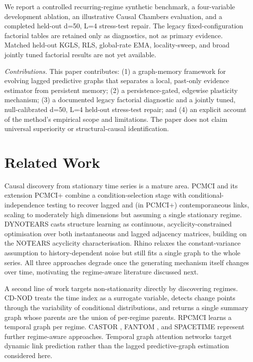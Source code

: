 \documentclass{ieeeaccess}
\begin{document}
We report a controlled recurring-regime synthetic benchmark, a four-variable development ablation, an illustrative Causal Chambers evaluation, and a completed held-out d=50, L=4 stress-test repair. The legacy fixed-configuration factorial tables are retained only as diagnostics, not as primary evidence. Matched held-out KGLS, RLS, global-rate EMA, locality-sweep, and broad jointly tuned factorial results are not yet available.

\noindent\textit{Contributions.} This paper contributes: (1) a graph-memory framework for evolving lagged predictive graphs that separates a local, past-only evidence estimator from persistent memory; (2) a persistence-gated, edgewise plasticity mechanism; (3) a documented legacy factorial diagnostic and a jointly tuned, null-calibrated d=50, L=4 held-out stress-test repair; and (4) an explicit account of the method's empirical scope and limitations. The paper does not claim universal superiority or structural-causal identification.

\section{Related Work}
\label{sec:related}
Causal discovery from stationary time series is a mature area. PCMCI and its extension PCMCI+ \cite{r1} combine a condition-selection stage with conditional-independence testing to recover lagged and (in PCMCI+) contemporaneous links, scaling to moderately high dimensions but assuming a single stationary regime. DYNOTEARS \cite{r2,r3} casts structure learning as continuous, acyclicity-constrained optimisation over both instantaneous and lagged adjacency matrices, building on the NOTEARS acyclicity characterisation. Rhino \cite{r4} relaxes the constant-variance assumption to history-dependent noise but still fits a single graph to the whole series. All three approaches degrade once the generating mechanism itself changes over time, motivating the regime-aware literature discussed next.

A second line of work targets non-stationarity directly by discovering regimes. CD-NOD \cite{r5} treats the time index as a surrogate variable, detects change points through the variability of conditional distributions, and returns a single summary graph whose parents are the union of per-regime parents. RPCMCI \cite{r6} learns a temporal graph per regime. CASTOR \cite{r7}, FANTOM \cite{r8}, and SPACETIME \cite{r9} represent further regime-aware approaches. Temporal graph attention networks \cite{r10} target dynamic link prediction rather than the lagged predictive-graph estimation considered here.
\end{document}
